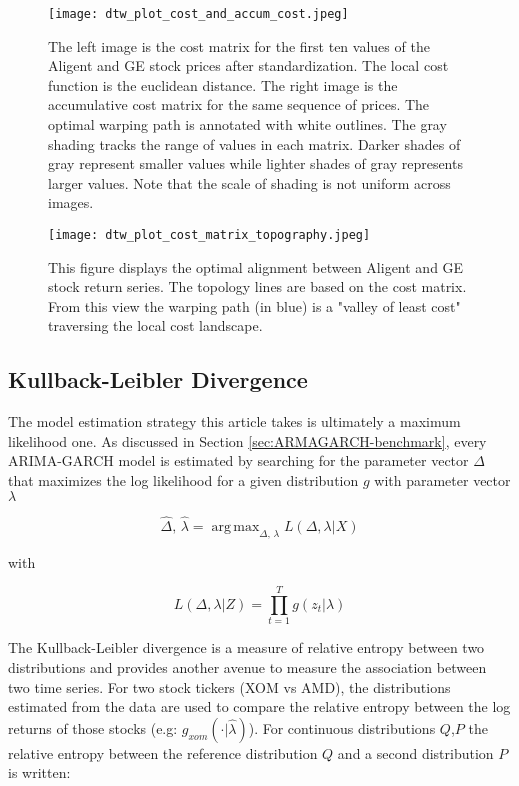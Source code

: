 \documentclass[12pt]{article}
\DeclareMathOperator*{\argmax}{arg\,max}
\begin{document}
\begin{figure}
    \centering
    \texttt{[image: dtw\_plot\_cost\_and\_accum\_cost.jpeg]}
    \caption{The left image is the cost matrix for the first ten values of the Aligent and GE stock prices after standardization. The local cost function is the euclidean distance. The right image is the accumulative cost matrix for the same sequence of prices. The optimal warping path is annotated with white outlines. The gray shading tracks the range of values in each matrix. Darker shades of gray represent smaller values while lighter shades of gray represents larger values. Note that the scale of shading is not uniform across images.}
    \label{fig:dtw_plot_cost_and_accum_cost}
\end{figure}

\begin{figure}
    \centering
    \texttt{[image: dtw\_plot\_cost\_matrix\_topography.jpeg]}
    \caption{This figure displays the optimal alignment between Aligent and GE stock return series. The topology lines are based on the cost matrix. From this view the warping path (in blue) is a "valley of least cost" traversing the local cost landscape.}
    \label{fig:dtw_plot_cost_matrix_topography}
\end{figure}


\pagebreak


\subsection{Kullback-Leibler Divergence} \label{sec:KL-Divergence}

The model estimation strategy this article takes is ultimately a maximum likelihood one. As discussed in Section \ref{sec:ARMAGARCH-benchmark}, every ARIMA-GARCH model is estimated by searching for the parameter vector $\Delta$ that maximizes the log likelihood for a given distribution $g$ with parameter vector $\lambda$

\begin{equation}
    \hat{\Delta},\, \hat{\lambda} = \argmax_{\Delta,\, \lambda} L(\Delta, \lambda | X)
\end{equation}

with 

\begin{equation}
    L(\Delta, \lambda | Z) = \prod_{t=1}^{T} g(z_{t}| \lambda)
\end{equation}

The Kullback-Leibler divergence is a measure of relative entropy between two distributions and provides another avenue to measure the association between two time series. For two stock tickers (XOM vs AMD), the distributions estimated from the data are used to compare the relative entropy between the log returns of those stocks (e.g: $g_{xom}(\cdot|\hat{\lambda})$). For continuous distributions $Q$,$P$ the relative entropy between the reference distribution $Q$ and a second distribution $P$ is written:
\end{document}
